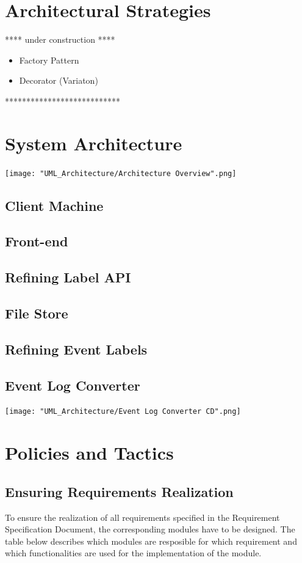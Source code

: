 \documentclass[notitlepage]{article}
\begin{document}
\begin{flushleft}
\section{Architectural Strategies}
{\color{gray} **** under construction ****}
\begin{itemize}
	\item Factory Pattern
	\item Decorator (Variaton)
\end{itemize}

{\color{gray} ***************************}
\section{System Architecture}
\texttt{[image: "UML\_Architecture/Architecture Overview".png]}

\subsection{Client Machine}
\subsection{Front-end}
\subsection{Refining Label API}
\subsection{File Store}
\subsection{Refining Event Labels}
\begin{landscape}
\subsection{Event Log Converter}
\texttt{[image: "UML\_Architecture/Event Log Converter CD".png]}
\end{landscape}






\section{Policies and Tactics}


\subsection{Ensuring Requirements Realization}
To ensure the realization of all requirements specified in the Requirement Specification Document, the corresponding modules have to be designed.
The table below describes which modules are resposible for which requirement and which functionalities are used for the implementation of the module. \\


\end{flushleft}
\end{document}
